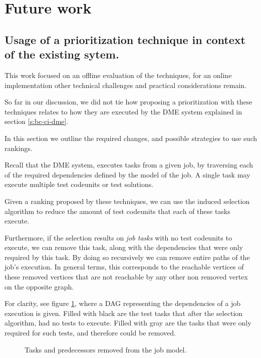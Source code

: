 \section{Future work}

\subsection{Usage of a prioritization technique in context of the existing sytem.}

This work focused on an offline evaluation of the techniques, for an online implementation
other technical challenges and practical considerations remain.

So far in our discussion, we did not tie how proposing a prioritization
with these techniques relates to how they are executed by the DME system explained
in section \ref{s:bc-ci-dme}.

In this section we outline the required changes, and possible strategies to use
such rankings.

Recall that the DME system, executes tasks from a given job, by
traversing each of the required dependencies defined by the model of the job. 
A single task may execute multiple test codeunits or test solutions. 

Given a ranking proposed by these techniques, we can use the induced selection
algorithm to reduce the amount of test codeunits that each of these tasks execute.

Furthermore, if the selection results on \emph{job tasks} with no test codeunits to
execute, we can remove this task, along with the dependencies that were 
only required by this task. By doing so recursively we can remove entire paths of the
job's execution. In general terms, this corresponds to the reachable vertices
of these removed vertices that are not reachable by any other non removed vertex 
on the opposite graph.

For clarity, see figure \ref{f:conc-fut-dag-removingtask}, where a DAG representing the dependencies of a job 
execution is given. Filled with black are the test tasks that after the selection
algorithm, had no tests to execute. Filled with gray are the tasks that were only
required for such tests, and therefore could be removed.

\begin{figure}
    \centering
    \def\svgwidth{0.5\columnwidth}
    
    \caption{Tasks and predecessors removed from the job model.}
    \label{f:conc-fut-dag-removingtask}
\end{figure}

